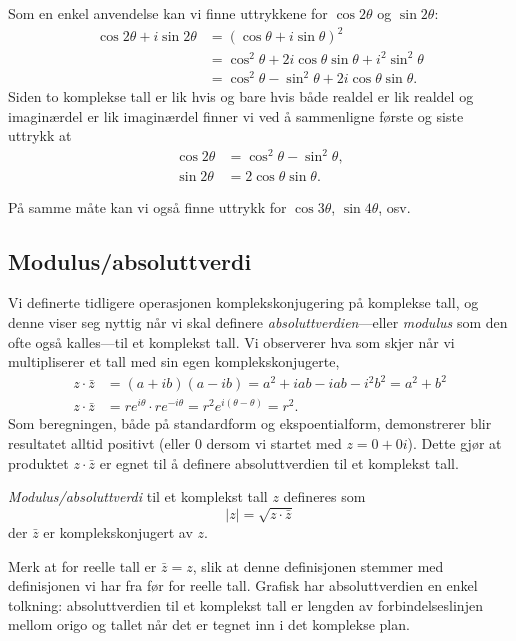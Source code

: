 \documentclass[a4paper,norsk,12pt]{article}
\newcounter{exa}
\begin{document}
\begin{texample}
Som en enkel anvendelse kan vi finne uttrykkene for $\cos2\theta$ og $\sin2\theta$:
\begin{align*}
	\cos2\theta + i\sin2\theta &= (\cos\theta + i\sin\theta)^2 \\
	&=\cos^2\theta + 2i\cos\theta\sin\theta + i^2\sin^2\theta \\
	&=\cos^2\theta-\sin^2\theta + 2i\cos\theta\sin\theta.
\end{align*}
Siden to komplekse tall er lik hvis og bare hvis både realdel er lik realdel og imaginærdel er lik imaginærdel finner vi ved å sammenligne første og siste uttrykk at
\begin{align*}
	\cos2\theta &= \cos^2\theta - \sin^2\theta, \\
	\sin2\theta &= 2\cos\theta\sin\theta.
\end{align*}
\end{texample}
\noindent
På samme måte kan vi også finne uttrykk for $\cos3\theta$, $\sin4\theta$, osv.

\subsection{Modulus/absoluttverdi}
Vi definerte tidligere operasjonen komplekskonjugering på komplekse tall, og denne viser seg nyttig når vi skal definere \emph{absoluttverdien}---eller \emph{modulus} som den ofte også kalles---til et komplekst tall. Vi observerer hva som skjer når vi multipliserer et tall med sin egen komplekskonjugerte,
\begin{align*}
	z\cdot\bar{z} &= (a + ib)(a-ib) = a^2 + iab - iab -i^2b^2 = a^2 + b^2 \\
	z\cdot\bar{z} &= re^{i\theta}\cdot re^{-i\theta} = r^2e^{i(\theta-\theta)} = r^2.
\end{align*}
Som beregningen, både på standardform og ekspoentialform, demonstrerer blir resultatet alltid positivt (eller 0 dersom vi startet med $z=0+0i$). Dette gjør at produktet $z\cdot\bar{z}$ er egnet til å definere absoluttverdien til et komplekst tall.
\begin{tdef}
\emph{Modulus/absoluttverdi} til et komplekst tall $z$ defineres som
\begin{displaymath}
	|z| = \sqrt{z\cdot\bar{z}}
\end{displaymath}
der $\bar{z}$ er komplekskonjugert av $z$.
\end{tdef}
\noindent
Merk at for reelle tall er $\bar{z}=z$, slik at denne definisjonen stemmer med definisjonen vi har fra før for reelle tall.
Grafisk har absoluttverdien en enkel tolkning: absoluttverdien til et komplekst tall er lengden av forbindelseslinjen mellom origo og tallet når det er tegnet inn i det komplekse plan.
\end{document}
